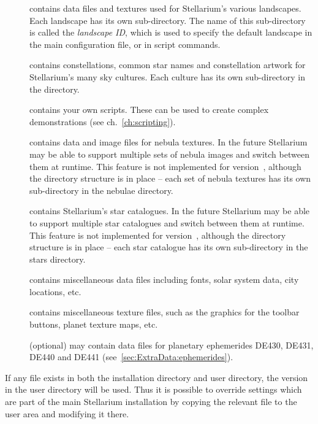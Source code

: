 \begin{description}
\item[] contains data files and textures used for
  Stellarium's various landscapes. Each landscape has its own
  sub-directory. The name of this sub-directory is called the
  \emph{landscape ID}, which is used to specify the default landscape in
  the main configuration file, or in script commands.
\item[] contains constellations, common star names and
  constellation artwork for Stellarium's many sky cultures. Each culture
  has its own sub-directory in the  directory.
\item[] contains your own scripts. These can be used to create
  complex demonstrations (see ch.~\ref{ch:scripting}). 
\item[] contains data and image files for nebula textures.
  In the future Stellarium may be able to support multiple sets of nebula
  images and switch between them at runtime. This feature is not
  implemented for version~\StelVersion, although the directory structure is in
  place -- each set of nebula textures has its own sub-directory in the
  nebulae directory.
\item[] contains Stellarium's star catalogues. In the
  future Stellarium may be able to support multiple star catalogues
  and switch between them at runtime. This feature is not implemented
  for version~\StelVersion, although the directory structure is in
  place -- each star catalogue has its own sub-directory in the stars
  directory.
\item[] contains miscellaneous data files including fonts,
  solar system data, city locations, etc.
\item[] contains miscellaneous texture files, such as the
  graphics for the toolbar buttons, planet texture maps, etc.
\item[] (optional) may contain data files for planetary
  ephemerides DE430, DE431, DE440 and DE441 (see~\ref{sec:ExtraData:ephemerides}).
\end{description}

If any file exists in both the installation directory and user
directory, the version in the user directory will be used. Thus it is
possible to override settings which are part of the main Stellarium
installation by copying the relevant file to the user area and modifying
it there.

